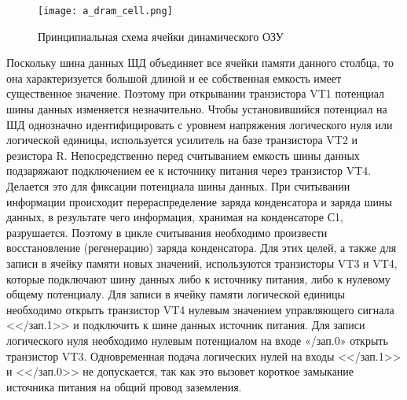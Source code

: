 \begin{figure}[ht]
\centering
  \texttt{[image: a\_dram\_cell.png]}  
  \caption{Принципиальная схема ячейки динамического ОЗУ}
  \label{fig:domain:ram:dram:dram_cell}
\end{figure}

Поскольку шина данных ШД объединяет все ячейки памяти данного столбца, то она характеризуется большой длиной и ее собственная емкость имеет существенное значение. Поэтому при открывании транзистора VT1 потенциал шины данных изменяется незначительно. Чтобы установившийся потенциал на ШД однозначно идентифицировать с уровнем напряжения логического нуля или логической единицы, используется усилитель на базе транзистора VT2 и резистора R. Непосредственно перед считыванием емкость шины данных подзаряжают подключением ее к источнику питания через транзистор VT4. Делается это для фиксации потенциала шины данных. При считывании информации происходит перераспределение заряда конденсатора и заряда шины данных, в результате чего информация, хранимая на конденсаторе С1, разрушается. Поэтому в цикле считывания необходимо произвести восстановление (регенерацию) заряда конденсатора. Для этих целей, а также для записи в ячейку памяти новых значений, используются транзисторы VT3 и VT4, которые подключают шину данных либо к источнику питания, либо к нулевому общему потенциалу. Для записи в ячейку памяти логической единицы необходимо открыть транзистор VT4 нулевым значением управляющего сигнала <</зап.1>> и подключить к шине данных источник питания. Для записи логического нуля необходимо нулевым потенциалом на входе «/зап.0» открыть транзистор VT3. Одновременная подача логических нулей на входы <</зап.1>>  и <</зап.0>> не допускается, так как это вызовет короткое замыкание источника питания на общий провод заземления.

